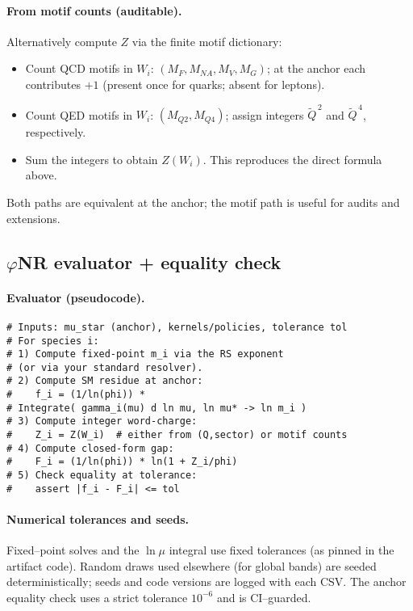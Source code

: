 \documentclass[epjc3]{svjour3}
\begin{document}
\paragraph{From motif counts (auditable).}
Alternatively compute $Z$ via the finite motif dictionary:
\begin{itemize}
  \item Count QCD motifs in $W_i$: $(M_F,M_{NA},M_V,M_G)$; at the anchor each contributes $+1$ (present once for quarks; absent for leptons).
  \item Count QED motifs in $W_i$: $(M_{Q2},M_{Q4})$; assign integers $\tilde Q^{\,2}$ and $\tilde Q^{\,4}$, respectively.
  \item Sum the integers to obtain $Z(W_i)$. This reproduces the direct formula above.
\end{itemize}
Both paths are equivalent at the anchor; the motif path is useful for audits and extensions.

\subsection{$\varphi$NR evaluator + equality check}
\paragraph{Evaluator (pseudocode).}
\begin{verbatim}
# Inputs: mu_star (anchor), kernels/policies, tolerance tol
# For species i:
# 1) Compute fixed-point m_i via the RS exponent 
# (or via your standard resolver).
# 2) Compute SM residue at anchor:
#    f_i = (1/ln(phi)) * 
# Integrate( gamma_i(mu) d ln mu, ln mu* -> ln m_i )
# 3) Compute integer word-charge:
#    Z_i = Z(W_i)  # either from (Q,sector) or motif counts
# 4) Compute closed-form gap:
#    F_i = (1/ln(phi)) * ln(1 + Z_i/phi)
# 5) Check equality at tolerance:
#    assert |f_i - F_i| <= tol
\end{verbatim}

\paragraph{Numerical tolerances and seeds.}
Fixed--point solves and the $\ln\mu$ integral use fixed tolerances (as pinned in the artifact code). Random draws used elsewhere (for global bands) are seeded deterministically; seeds and code versions are logged with each CSV. The anchor equality check uses a strict tolerance $10^{-6}$ and is CI--guarded.
\end{document}
